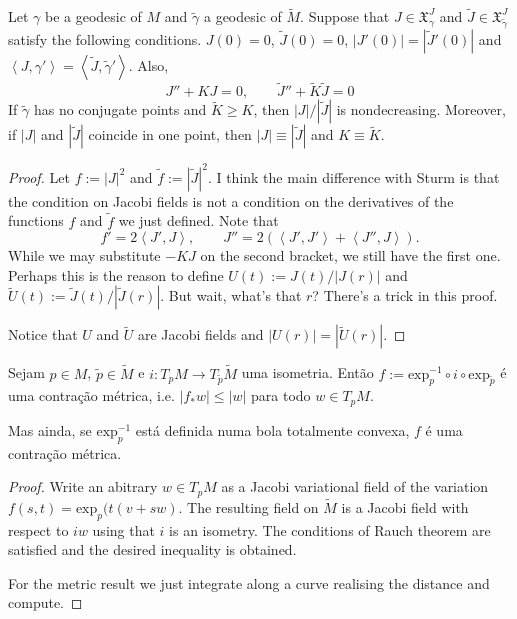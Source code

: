 \begin{theorem}[Rauch]
\label{theorem-Rauch}
Let $\gamma$ be a geodesic of $M$ and $\tilde{\gamma}$ a geodesic of
$\tilde{M}$. Suppose that $J \in \mathfrak{X}^J_\gamma$ and $\tilde{J}\in
\mathfrak{X}^J_{\tilde{\gamma}}$ satisfy the following conditions. $J(0)=0$,
$\tilde{J}(0)=0$, $|J'(0)|=|\tilde{J}'(0)|$ and 
$\left<J,\gamma'\right>=\left<\tilde{J},\tilde{\gamma}'\right>$. Also,
$$
J''+K J=0,\qquad \tilde{J}''+\tilde{K}\tilde{J}=0
$$
If $\tilde{\gamma}$ has no conjugate points and $\tilde{K}\geq K$, then 
$|J|/|\tilde{J}|$ is nondecreasing. Moreover, if $|J|$ and $|\tilde{J}|$
coincide in one point, then $|J|\equiv |\tilde{J}|$ and $K \equiv \tilde{K}$.
\end{theorem}

\begin{proof}
Let $f:=|J|^2$ and $\tilde{f}:=|\tilde{J}|^2$. I think the main difference with
Sturm is that the condition on Jacobi fields is not a condition on the
derivatives of the functions $f$ and $\tilde{f}$ we just defined. Note that
$$
f'=2\left<J',J\right>,\qquad J''=2(\left<J',J'\right>+\left<J'',J\right>).
$$
While we may substitute $-KJ$ on the second bracket, we still have the first
one. Perhaps this is the reason to define $U(t):=J(t)/|J(r)|$ and
$\tilde{U}(t):=\tilde{J}(t)/|\tilde{J}(r)|$. But wait, what's that $r$? There's
a trick in this proof.

Notice that $U$ and $\tilde{U}$ are Jacobi fields and $|U(r)|=|\tilde{U}(r)|$.
\end{proof}

\begin{proposition}
\label{proposition-contraction}
Sejam $p \in M$, $\tilde{p} \in \tilde{M}$ e $i:T_pM \to T_{\tilde{p}}\tilde{M}$
uma isometria. Então $f:=\text{exp}^{-1}_p \circ i \circ
\text{exp}_{\tilde{p}}$ é uma contração métrica, i.e. $|f_*w|\leq |w|$
para todo $w \in T_pM$.

Mas ainda, se $\text{exp}_p^{-1}$ está definida numa bola totalmente
convexa, $f$ é uma contração métrica.
\end{proposition}

\begin{proof}
Write an abitrary $w\in T_p M$ as a Jacobi variational field of the variation 
$f(s,t)=\text{exp}_p(t(v+sw)$. The resulting field on $\tilde{M}$ is a
Jacobi field with respect to $iw$ using that $i$ is an isometry. The conditions
of Rauch theorem are satisfied and the desired inequality is obtained.

For the metric result we just integrate along a curve realising the distance and
compute.
\end{proof}

